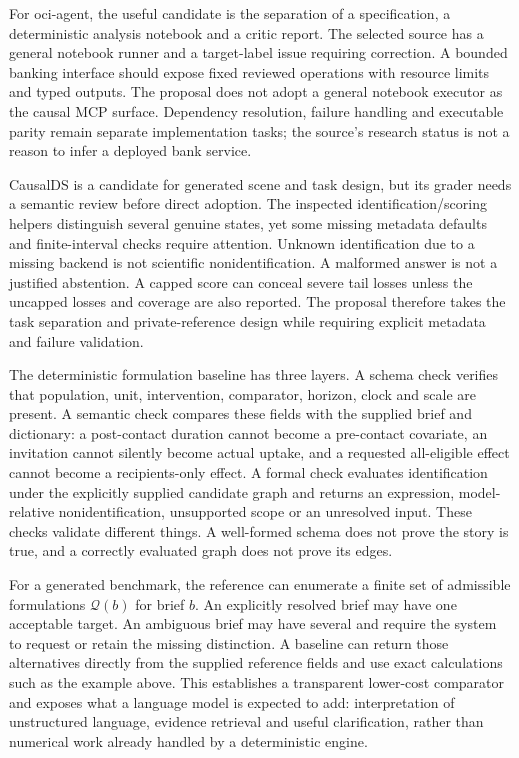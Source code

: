 For oci-agent, the useful candidate is the separation of a
specification, a deterministic analysis notebook and a critic report.
The selected source has a general notebook runner and a target-label
issue requiring correction. A bounded banking interface should expose
fixed reviewed operations with resource limits and typed outputs. The
proposal does not adopt a general notebook executor as the causal MCP
surface. Dependency resolution, failure handling and executable parity
remain separate implementation tasks; the source's research status is
not a reason to infer a deployed bank service.
\citep{v12_la_package_oci_agent}

CausalDS is a candidate for generated scene and task design, but its
grader needs a semantic review before direct adoption. The inspected
identification/scoring helpers distinguish several genuine states, yet
some missing metadata defaults and finite-interval checks require
attention. Unknown identification due to a missing backend is not
scientific nonidentification. A malformed answer is not a justified
abstention. A capped score can conceal severe tail losses unless the
uncapped losses and coverage are also reported. The proposal therefore
takes the task separation and private-reference design while requiring
explicit metadata and failure validation.
\citep{v12_la_package_causalds}

The deterministic formulation baseline has three layers. A schema check
verifies that population, unit, intervention, comparator, horizon, clock
and scale are present. A semantic check compares these fields with the
supplied brief and dictionary: a post-contact duration cannot become a
pre-contact covariate, an invitation cannot silently become actual
uptake, and a requested all-eligible effect cannot become a
recipients-only effect. A formal check evaluates identification under
the explicitly supplied candidate graph and returns an expression,
model-relative nonidentification, unsupported scope or an unresolved
input. These checks validate different things. A well-formed schema does
not prove the story is true, and a correctly evaluated graph does not
prove its edges.

For a generated benchmark, the reference can enumerate a finite set of
admissible formulations \(\mathcal Q(b)\) for brief \(b\). An explicitly
resolved brief may have one acceptable target. An ambiguous brief may
have several and require the system to request or retain the missing
distinction. A baseline can return those alternatives directly from the
supplied reference fields and use exact calculations such as the example
above. This establishes a transparent lower-cost comparator and exposes
what a language model is expected to add: interpretation of unstructured
language, evidence retrieval and useful clarification, rather than
numerical work already handled by a deterministic engine.

